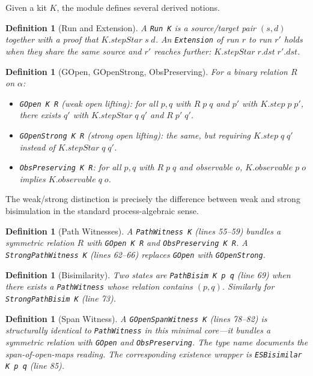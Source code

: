 \documentclass[11pt]{article}
\newtheorem{definition}[theorem]{Definition}
\begin{document}
Given a kit $K$, the module defines several derived notions.

\begin{definition}[Run and Extension]
A \texttt{Run K} is a source/target pair $(s, d)$ together with a proof
that $K.\mathit{stepStar}\; s\; d$.  An \texttt{Extension} of run $r$
to run $r'$ holds when they share the same source and $r'$ reaches
further: $K.\mathit{stepStar}\; r.\mathit{dst}\; r'.\mathit{dst}$.
\end{definition}

\begin{definition}[GOpen, GOpenStrong, ObsPreserving]\label{def:gopen}
For a binary relation $R$ on $\alpha$:
\begin{itemize}
\item \texttt{GOpen K R} (weak open lifting): for all $p, q$ with
  $R\;p\;q$ and $p' $ with $K.\mathit{step}\;p\;p'$, there exists $q'$
  with $K.\mathit{stepStar}\;q\;q'$ and $R\;p'\;q'$.
\item \texttt{GOpenStrong K R} (strong open lifting): the same, but
  requiring $K.\mathit{step}\;q\;q'$ instead of
  $K.\mathit{stepStar}\;q\;q'$.
\item \texttt{ObsPreserving K R}: for all $p, q$ with $R\;p\;q$ and
  observable $o$, $K.\mathit{observable}\;p\;o$ implies
  $K.\mathit{observable}\;q\;o$.
\end{itemize}
\end{definition}

The weak/strong distinction is precisely the difference between weak and
strong bisimulation in the standard process-algebraic sense.

\begin{definition}[Path Witnesses]
A \texttt{PathWitness K} (lines 55--59) bundles a symmetric relation
$R$ with \texttt{GOpen K R} and \texttt{ObsPreserving K R}.
A \texttt{StrongPathWitness K} (lines 62--66) replaces \texttt{GOpen}
with \texttt{GOpenStrong}.
\end{definition}

\begin{definition}[Bisimilarity]
Two states are \texttt{PathBisim K p q} (line 69) when there exists a
\texttt{PathWitness} whose relation contains $(p, q)$.
Similarly for \texttt{StrongPathBisim K} (line 73).
\end{definition}

\begin{definition}[Span Witness]
A \texttt{GOpenSpanWitness K} (lines 78--82) is structurally identical
to \texttt{PathWitness} in this minimal core---it bundles a symmetric
relation with \texttt{GOpen} and \texttt{ObsPreserving}.  The type name
documents the span-of-open-maps reading.  The corresponding existence
wrapper is \texttt{ESBisimilar K p q} (line 85).
\end{definition}
\end{document}
